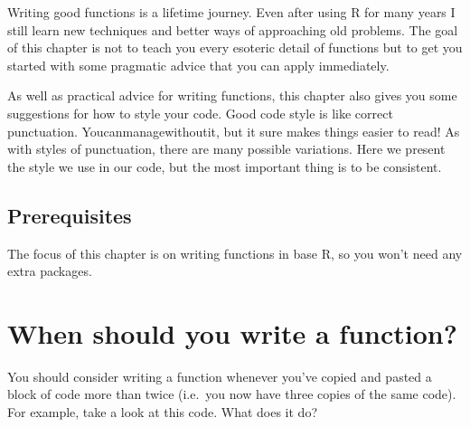 \documentclass[]{book}
\begin{document}
Writing good functions is a lifetime journey. Even after using R for
many years I still learn new techniques and better ways of approaching
old problems. The goal of this chapter is not to teach you every
esoteric detail of functions but to get you started with some pragmatic
advice that you can apply immediately.

As well as practical advice for writing functions, this chapter also
gives you some suggestions for how to style your code. Good code style
is like correct punctuation. Youcanmanagewithoutit, but it sure makes
things easier to read! As with styles of punctuation, there are many
possible variations. Here we present the style we use in our code, but
the most important thing is to be consistent.

\subsection{Prerequisites}\label{prerequisites-12}

The focus of this chapter is on writing functions in base R, so you
won't need any extra packages.

\section{When should you write a
function?}\label{when-should-you-write-a-function}

You should consider writing a function whenever you've copied and pasted
a block of code more than twice (i.e.~you now have three copies of the
same code). For example, take a look at this code. What does it do?
\end{document}
